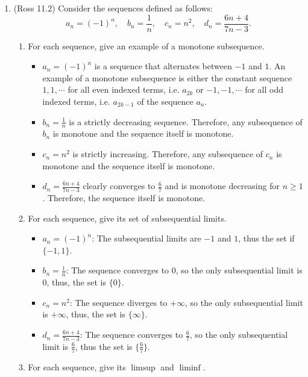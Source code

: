 \documentclass [10pt]{article}
\newcommand{\jg}[1]{{\color{blue} #1}}
\begin{document}
\begin{enumerate}
\item (Ross 11.2)
Consider the sequences defined as follows:
$$
a_n=(-1)^n, \quad b_n=\frac{1}{n}, \quad c_n=n^2, \quad d_n=\frac{6 n+4}{7 n-3} .
$$
\begin{enumerate}
\item For each sequence, give an example of a monotone subsequence.

\jg{
\begin{itemize}
    \item $a_n = (-1)^n$ is a sequence that alternates between $-1$ and $1$. An example of a monotone subsequence is either the constant sequence $1, 1, \cdots$ for all even indexed terms, i.e. $a_{2k}$ or $-1, -1, \cdots$ for all odd indexed terms, i.e. $a_{2k-1}$ of the sequence $a_n$. 

    \item $b_n = \frac{1}{n}$ is a strictly decreasing sequence. Therefore, any subsequence of $b_n$ is monotone and the sequence itself is monotone.

    \item $c_n = n^2$ is strictly increasing. Therefore, any subsequence of $c_n$ is monotone and the sequence itself is monotone. 

    \item $d_n=\frac{6 n+4}{7 n-3}$ clearly converges to $\frac{6}{7}$ and is monotone decreasing for $n \geq 1$. Therefore, the sequence itself is monotone. 
\end{itemize}
}
\item For each sequence, give its set of subsequential limits.

\jg{
\begin{itemize}
    \item $a_n = (-1)^n$: The subsequential limits are $-1$ and $1$, thus the set if $\{ -1, 1\}$. 
    \item $b_n = \frac{1}{n}$: The sequence converges to $0$, so the only subsequential limit is 0, thus, the set is $\{ 0 \}$. 
    \item $c_n = n^2$: The sequence diverges to $+ \infty$, so the only subsequential limit is $+ \infty$, thus, the set is $\{ \infty \}$. 
    \item  $d_n=\frac{6 n+4}{7 n-3}$: The sequence converges to $\frac{6}{7}$, so the only subsequential limit is $\frac{6}{7}$, thus the set is $\{ \frac{6}{7} \}$. 
\end{itemize}
}

\item For each sequence, give its $\limsup$ and $\liminf$.


\end{enumerate}
\end{enumerate}
\end{document}
